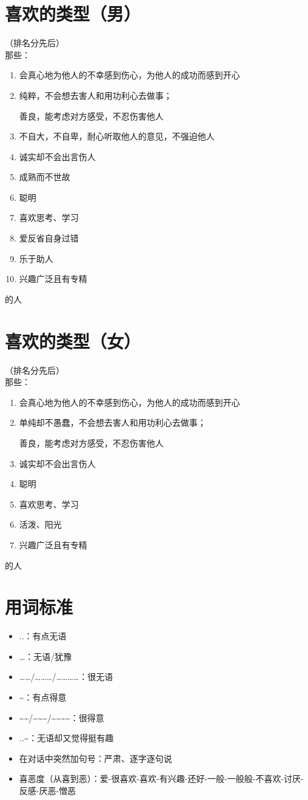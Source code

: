 \documentclass[UTF8]{ctexart}
\begin{document}
\section{喜欢的类型（男）}
\noindent （排名分先后）\\
那些：
\begin{enumerate}[1.]
\item 会真心地为他人的不幸感到伤心，为他人的成功而感到开心
\item 纯粹，不会想去害人和用功利心去做事；

善良，能考虑对方感受，不忍伤害他人
\item 不自大，不自卑，耐心听取他人的意见，不强迫他人
\item 诚实却不会出言伤人
\item 成熟而不世故
\item 聪明
\item 喜欢思考、学习
\item 爱反省自身过错
\item 乐于助人
\item 兴趣广泛且有专精
\end{enumerate}
的人
\section{喜欢的类型（女）}
\noindent （排名分先后）\\
那些：
\begin{enumerate}[1.]
\item 会真心地为他人的不幸感到伤心，为他人的成功而感到开心
\item 单纯却不愚蠢，不会想去害人和用功利心去做事；

善良，能考虑对方感受，不忍伤害他人
\item 诚实却不会出言伤人
\item 聪明
\item 喜欢思考、学习
\item 活泼、阳光
\item 兴趣广泛且有专精
\end{enumerate}
的人
\paragraph{}
\section{用词标准}
\begin{itemize}
\item ..：有点无语
\item …：无语/犹豫
\item ……/………/…………：很无语
\item \~{}：有点得意
\item \~{}\~{}/\~{}\~{}\~{}/\~{}\~{}\~{}\~{}：很得意
\item ..\~{}：无语却又觉得挺有趣
\item 在对话中突然加句号：严肃、逐字逐句说
\item 喜恶度（从喜到恶）：爱-很喜欢-喜欢-有兴趣-还好-一般-一般般-不喜欢-讨厌-反感-厌恶-憎恶
\end{itemize}
\end{document}
